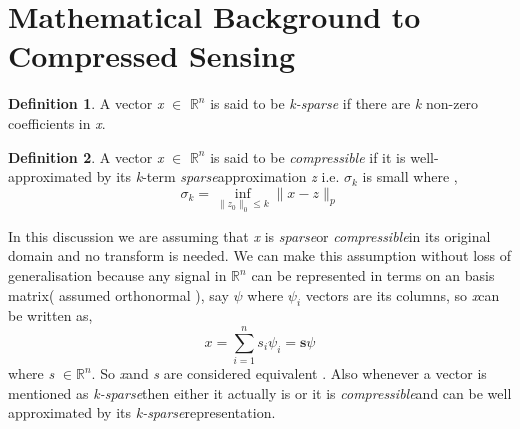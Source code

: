 \documentclass[12pt]{article}
\theoremstyle{definition}
\newtheorem{defn}{Definition}[section]
\def\compressible{\textit{compressible}\hspace{0.1in}}
\def\sparse{\textit{sparse}\hspace{0.1in}}
\def\ksparse{\textit{k-sparse}\hspace{0.1in}}
\def\x{\textit{x}\hspace{0.1in}}
\begin{document}
\section{Mathematical Background to Compressed Sensing}
\begin{defn}
 A vector \textit{x} $\in$ $\mathbb{R}^n$ is said to be \textit{k-sparse} if there are \textit{k} non-zero coefficients in \textit{x}.
\end{defn}
\begin{defn}
 A vector \textit{x} $\in$ $\mathbb{R}^n$ is said to be \textit{compressible} if it is well-approximated by its
 \textit{k}-term \sparse approximation \textit{z} i.e. $\sigma_k$ is small where \cite{CS_book},
 \begin{equation}
\sigma_k = \inf_{\|z_0\|_0 \leq k} \| x - z \|_p
\end{equation}
\end{defn}
In this discussion we are assuming that \textit{x} is \sparse or \compressible in its original domain and no transform
is needed. We can make this assumption without loss of generalisation because any signal in $\mathbb{R}^n$ can be 
represented in terms on an basis matrix( assumed orthonormal ), say $\psi$ where $\psi_i$ vectors are its columns, so \x can be written as,
\begin{equation}
 x = \sum_{i=1}^{n} s_i \psi_i = \textbf{s} \psi 
\end{equation}
where \textit{s} $\in \mathbb{R}^n$. So \x and \textit{s} are considered equivalent \cite{Baraniuk-CS}. Also whenever
a vector is mentioned as \ksparse then either it actually is or it is \compressible and can be well approximated 
by its \ksparse representation.
\end{document}
